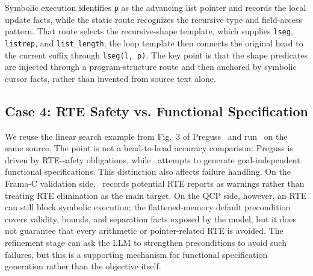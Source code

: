 Symbolic execution identifies \texttt{p} as the advancing list pointer and records the local update facts, while the static route recognizes the recursive type and field-access pattern. That route selects the recursive-shape template, which supplies \texttt{lseg}, \texttt{listrep}, and \texttt{list\_length}; the loop template then connects the original head to the current suffix through \texttt{lseg(l, p)}. The key point is that the shape predicates are injected through a program-structure route and then anchored by symbolic cursor facts, rather than invented from source text alone.

\subsection{Case 4: RTE Safety vs. Functional Specification}
\label{app:case-search}

We reuse the linear search example from Fig.~3 of Preguss~\cite{Wang2025ATO} and run \toolname\ on the same source. The point is not a head-to-head accuracy comparison: Preguss is driven by RTE-safety obligations, while \toolname\ attempts to generate goal-independent functional specifications. This distinction also affects failure handling. On the Frama-C validation side, \toolname\ records potential RTE reports as warnings rather than treating RTE elimination as the main target. On the QCP side, however, an RTE can still block symbolic execution; the flattened-memory default precondition covers validity, bounds, and separation facts exposed by the model, but it does not guarantee that every arithmetic or pointer-related RTE is avoided. The refinement stage can ask the LLM to strengthen preconditions to avoid such failures, but this is a supporting mechanism for functional specification generation rather than the objective itself.

